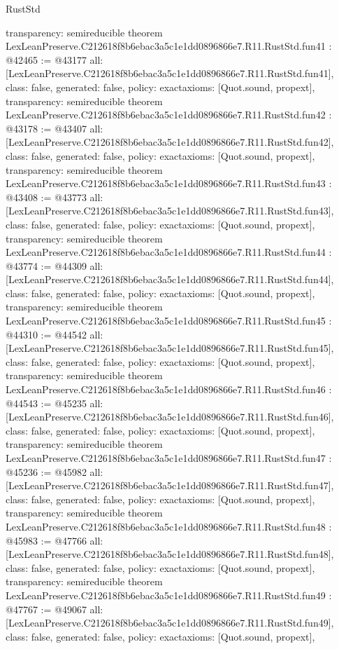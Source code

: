 \begin{lexlean}{RustStd}
\begin{coremodule}
{  transparency: semireducible
}
theorem LexLeanPreserve.C212618f8b6ebac3a5c1e1dd0896866e7.R11.RustStd.fun41 : @42465 := @43177 {
  all: [LexLeanPreserve.C212618f8b6ebac3a5c1e1dd0896866e7.R11.RustStd.fun41],
  class: false,
  generated: false,
  policy: exact{axioms: [Quot.sound, propext]},
  transparency: semireducible
}
theorem LexLeanPreserve.C212618f8b6ebac3a5c1e1dd0896866e7.R11.RustStd.fun42 : @43178 := @43407 {
  all: [LexLeanPreserve.C212618f8b6ebac3a5c1e1dd0896866e7.R11.RustStd.fun42],
  class: false,
  generated: false,
  policy: exact{axioms: [Quot.sound, propext]},
  transparency: semireducible
}
theorem LexLeanPreserve.C212618f8b6ebac3a5c1e1dd0896866e7.R11.RustStd.fun43 : @43408 := @43773 {
  all: [LexLeanPreserve.C212618f8b6ebac3a5c1e1dd0896866e7.R11.RustStd.fun43],
  class: false,
  generated: false,
  policy: exact{axioms: [Quot.sound, propext]},
  transparency: semireducible
}
theorem LexLeanPreserve.C212618f8b6ebac3a5c1e1dd0896866e7.R11.RustStd.fun44 : @43774 := @44309 {
  all: [LexLeanPreserve.C212618f8b6ebac3a5c1e1dd0896866e7.R11.RustStd.fun44],
  class: false,
  generated: false,
  policy: exact{axioms: [Quot.sound, propext]},
  transparency: semireducible
}
theorem LexLeanPreserve.C212618f8b6ebac3a5c1e1dd0896866e7.R11.RustStd.fun45 : @44310 := @44542 {
  all: [LexLeanPreserve.C212618f8b6ebac3a5c1e1dd0896866e7.R11.RustStd.fun45],
  class: false,
  generated: false,
  policy: exact{axioms: [Quot.sound, propext]},
  transparency: semireducible
}
theorem LexLeanPreserve.C212618f8b6ebac3a5c1e1dd0896866e7.R11.RustStd.fun46 : @44543 := @45235 {
  all: [LexLeanPreserve.C212618f8b6ebac3a5c1e1dd0896866e7.R11.RustStd.fun46],
  class: false,
  generated: false,
  policy: exact{axioms: [Quot.sound, propext]},
  transparency: semireducible
}
theorem LexLeanPreserve.C212618f8b6ebac3a5c1e1dd0896866e7.R11.RustStd.fun47 : @45236 := @45982 {
  all: [LexLeanPreserve.C212618f8b6ebac3a5c1e1dd0896866e7.R11.RustStd.fun47],
  class: false,
  generated: false,
  policy: exact{axioms: [Quot.sound, propext]},
  transparency: semireducible
}
theorem LexLeanPreserve.C212618f8b6ebac3a5c1e1dd0896866e7.R11.RustStd.fun48 : @45983 := @47766 {
  all: [LexLeanPreserve.C212618f8b6ebac3a5c1e1dd0896866e7.R11.RustStd.fun48],
  class: false,
  generated: false,
  policy: exact{axioms: [Quot.sound, propext]},
  transparency: semireducible
}
theorem LexLeanPreserve.C212618f8b6ebac3a5c1e1dd0896866e7.R11.RustStd.fun49 : @47767 := @49067 {
  all: [LexLeanPreserve.C212618f8b6ebac3a5c1e1dd0896866e7.R11.RustStd.fun49],
  class: false,
  generated: false,
  policy: exact{axioms: [Quot.sound, propext]},
}
\end{coremodule}
\end{lexlean}
